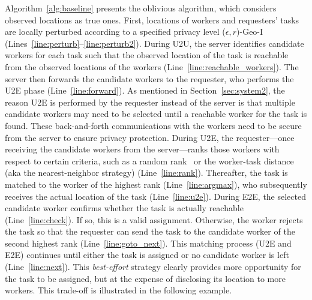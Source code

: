 \documentclass{USC-Thesis}
\numberwithin{equation}{chapter}
\begin{document}
Algorithm~\ref{alg:baseline} presents the oblivious algorithm, which considers observed locations as true ones. First, locations of workers and requesters' tasks are locally perturbed according to a specified privacy level ($\epsilon,r$)-Geo-I~\cite{andres2013geo} (Lines~\ref{line:perturb}--\ref{line:perturb2}). During U2U, the server identifies candidate workers for each task such that the observed location of the task is reachable from the observed locations of the workers (Line~\ref{line:reachable_workers}). The server then forwards the candidate workers to the requester, who performs the U2E phase (Line~\ref{line:forward}). As mentioned in Section~\ref{sec:system2}, the reason U2E is performed by the requester instead of the server is that multiple candidate workers may need to be selected until a reachable worker for the task is found. These back-and-forth communications with the workers need to be secure from the server to ensure privacy protection.
During U2E, the requester---once receiving the candidate workers from the server---ranks those workers with respect to certain criteria, such as a random rank~\cite{karp1990optimal}
or the worker-task distance (aka the nearest-neighbor strategy) (Line~\ref{line:rank}). Thereafter, the task is matched to the worker of the highest rank (Line~\ref{line:argmax}), who subsequently receives the actual location of the task (Line~\ref{line:u2e}).
During E2E, the selected candidate worker confirms whether the task is actually reachable (Line~\ref{line:check}). If so, this is a valid assignment. Otherwise, the worker rejects the task so that the requester can send the task to the candidate worker of the second highest rank (Line~\ref{line:goto_next}). This matching process (U2E and E2E) continues until either the task is assigned or no candidate worker is left (Line~\ref{line:next}). This \emph{best-effort} strategy clearly provides more opportunity for the task to be assigned, but at the expense of disclosing its location to more workers. This trade-off is illustrated in the following example.
\end{document}
